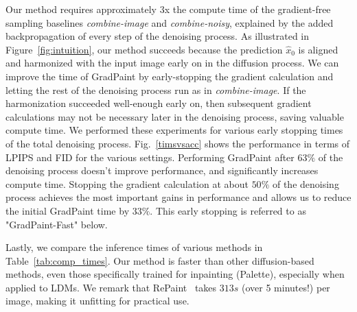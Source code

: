 Our method requires approximately 3x the compute time of the  gradient-free sampling baselines \emph{combine-image} and 
\emph{combine-noisy}, explained by the added backpropagation of every step of the denoising process. As illustrated in Figure~\ref{fig:intuition}, 
our method succeeds because the prediction $\hat{x}_0$ is aligned and harmonized with the input image early
 on in the diffusion process. We can improve the time of GradPaint by early-stopping the gradient calculation and letting the 
 rest of the denoising process run as in \emph{combine-image}. If the harmonization succeeded well-enough early on, then subsequent
  gradient calculations may not be necessary later in the denoising process, saving valuable compute time. We performed these 
  experiments for various early stopping times of the total denoising process. Fig.~\ref{timsvsacc} shows the performance in terms
   of LPIPS and FID for the various settings. Performing GradPaint after $63\%$ of the denoising process doesn't improve performance, 
   and significantly increases compute time. Stopping the gradient calculation at about $50\%$ of the denoising process achieves the 
   most important gains in performance and allows us to reduce the initial GradPaint time by $33\%$. This early stopping is referred 
   to as "GradPaint-Fast" below.
   
   
Lastly, we compare the inference times of various methods in Table~\ref{tab:comp_times}.
Our method is faster than other diffusion-based methods, even those specifically trained for inpainting (Palette), 
especially when applied to LDMs. We remark that RePaint~\citep{lugmayr2022repaint} takes $313s$ (over 5 minutes!) per image, 
making it unfitting for practical use.



